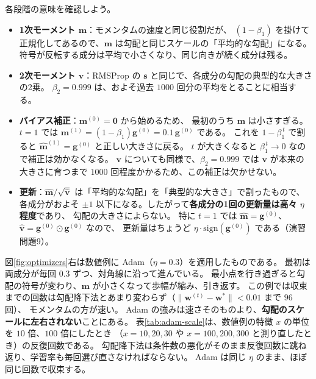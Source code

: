 各段階の意味を確認しよう。

\begin{itemize}
  \item \textbf{1次モーメント $\bm{m}$}：モメンタムの速度と同じ役割だが、
    $(1 - \beta_1)$ を掛けて正規化してあるので、$\bm{m}$ は勾配と同じスケールの「平均的な勾配」になる。
    符号が反転する成分は平均で小さくなり、同じ向きが続く成分は残る。
  \item \textbf{2次モーメント $\bm{v}$}：RMSProp の $\bm{s}$ と同じで、各成分の勾配の典型的な大きさの2乗。
    $\beta_2 = 0.999$ は、およそ過去 $1000$ 回分の平均をとることに相当する。
  \item \textbf{バイアス補正}：$\bm{m}^{(0)} = \bm{0}$ から始めるため、
    最初のうち $\bm{m}$ は小さすぎる。$t = 1$ では $\bm{m}^{(1)} = (1 - \beta_1)\bm{g}^{(0)} = 0.1\,\bm{g}^{(0)}$ である。
    これを $1 - \beta_1^{\,t}$ で割ると $\hat{\bm{m}}^{(1)} = \bm{g}^{(0)}$ と正しい大きさに戻る。
    $t$ が大きくなると $\beta_1^{\,t} \to 0$ なので補正は効かなくなる。
    $\bm{v}$ についても同様で、$\beta_2 = 0.999$ では $\bm{v}$ が本来の大きさに育つまで
    $1000$ 回程度かかるため、この補正は欠かせない。
  \item \textbf{更新}：$\hat{\bm{m}}/\sqrt{\hat{\bm{v}}}$ は「平均的な勾配」を「典型的な大きさ」で割ったもので、
    各成分がおよそ $\pm 1$ 以下になる。したがって\textbf{各成分の1回の更新量は高々 $\eta$ 程度}であり、
    勾配の大きさによらない。
    特に $t = 1$ では $\hat{\bm{m}} = \bm{g}^{(0)}$、$\hat{\bm{v}} = \bm{g}^{(0)} \odot \bm{g}^{(0)}$ なので、
    更新量はちょうど $\eta \cdot \mathrm{sign}(\bm{g}^{(0)})$ である（演習問題9）。
\end{itemize}

図\ref{fig:optimizers}右は数値例に Adam（$\eta = 0.3$）を適用したものである。
最初は両成分が毎回 $0.3$ ずつ、対角線に沿って進んでいる。
最小点を行き過ぎると勾配の符号が変わり、$\bm{m}$ が小さくなって歩幅が縮み、引き返す。
この例では収束までの回数は勾配降下法とあまり変わらず（$\|\bm{w}^{(t)} - \bm{w}^*\| < 0.01$ まで $96$ 回）、
モメンタムの方が速い。
Adam の強みは速さそのものより、\textbf{勾配のスケールに左右されない}ことにある。
表\ref{tab:adam-scale}は、数値例の特徴 $x$ の単位を $10$ 倍、$100$ 倍にしたとき
（$x = 10, 20, 30$ や $x = 100, 200, 300$ と測り直したとき）の反復回数である。
勾配降下法は条件数の悪化がそのまま反復回数に跳ね返り、学習率も毎回選び直さなければならない。
Adam は同じ $\eta$ のまま、ほぼ同じ回数で収束する。

